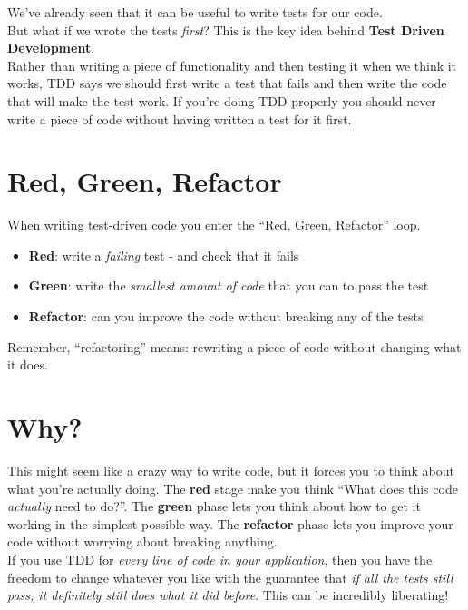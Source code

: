 We've already seen that it can be useful to write tests for our code.
\\

But what if we wrote the tests \textit{first}? This is the key idea behind \textbf{Test Driven Development}.
\\

Rather than writing a piece of functionality and then testing it when we think it works, TDD says we should first write a test that fails and then write the code that will make the test work. If you're doing TDD properly you should never write a piece of code without having written a test for it first.

\section{Red, Green, Refactor}

When writing test-driven code you enter the ``Red, Green, Refactor'' loop.

\begin{itemize}
    \item \textbf{Red}: write a \textit{failing} test - and check that it fails
    \item \textbf{Green}: write the \textit{smallest amount of code} that you can to pass the test
    \item \textbf{Refactor}: can you improve the code without breaking any of the tests
\end{itemize}

Remember, ``refactoring'' means: rewriting a piece of code without changing what it does.

\section{Why?}

This might seem like a crazy way to write code, but it forces you to think about what you're actually doing. The \textbf{red} stage make you think ``What does this code \textit{actually} need to do?''. The \textbf{green} phase lets you think about how to get it working in the simplest possible way. The \textbf{refactor} phase lets you improve your code without worrying about breaking anything.
\\

If you use TDD for \textit{every line of code in your application}, then you have the freedom to change whatever you like with the guarantee that \textit{if all the tests still pass, it definitely still does what it did before}. This can be incredibly liberating!
\\

